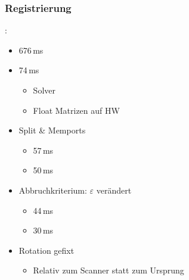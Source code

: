 \documentclass{beamer}
\begin{document}
\subsubsection*{Registrierung}
\begin{frame}{\subsecname: \subsubsecname}
\begin{itemize}
\item[]{\makebox[5cm]{\hfill} 676\,ms}
\item{ 74\,ms}
\begin{itemize}
\item{Solver}
\item{Float Matrizen auf HW}
\end{itemize}
\item{Split \& Memports}
\begin{itemize}
\item{}\hspace{-\leftmargin} \normalsize 57\,ms
\item{}\hspace{-\leftmargin} \normalsize 50\,ms
\end{itemize}
\item{Abbruchkriterium: $\varepsilon$ verändert}
\begin{itemize}
\item{}\hspace{-\leftmargin} \normalsize 44\,ms
\item{}\hspace{-\leftmargin} \normalsize 30\,ms
\end{itemize}
\end{itemize}
\vspace{0.5cm}
\begin{itemize}
\item{Rotation gefixt}
\begin{itemize}
\item{Relativ zum Scanner statt zum Ursprung}
\end{itemize}
\end{itemize}
\end{frame}
\end{document}
